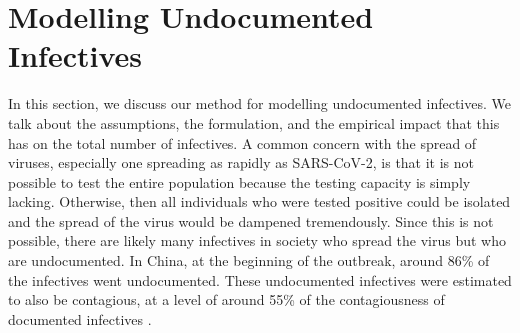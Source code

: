 \documentclass[12pt]{article}
\begin{document}
	
	\section{Modelling Undocumented Infectives} \label{sec:undocumented_modelling}
	In this section, we discuss our method for modelling undocumented infectives. We talk about the assumptions, the formulation, and the empirical impact that this has on the total number of infectives. A common concern with the spread of viruses, especially one spreading as rapidly as SARS-CoV-2, is that it is not possible to test the entire population because the testing capacity is simply lacking. Otherwise, then all individuals who were tested positive could be isolated and the spread of the virus would be dampened tremendously. Since this is not possible, there are likely many infectives in society who spread the virus but who are undocumented. In China, at the beginning of the outbreak, around 86\% of the infectives went undocumented. These undocumented infectives were estimated to also be contagious, at a level of around 55\% of the contagiousness of documented infectives \parencite{li2020undocumented}. \\
	
\end{document}
